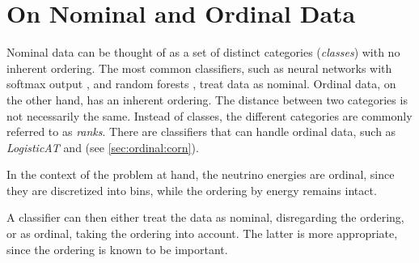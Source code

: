 \section{On Nominal and Ordinal Data}
Nominal data can be thought of as a set of distinct categories
  (\emph{classes})
with no inherent ordering.
The most common classifiers,
  such as
    neural networks with softmax output \cite{dsea_samuel},
    and random forests \cite{hymon2021seasonal},
treat data as nominal.
%
Ordinal data, on the other hand,
has an inherent ordering.
The distance between two categories is not necessarily the same. %
Instead of classes,
  the different categories are commonly referred to as \emph{ranks}.
There are classifiers that can handle ordinal data,
such as
  \emph{LogisticAT} \cite{logisticat, dsea_jan}
  and \corn{} (see \autoref{sec:ordinal:corn}).

In the context of the problem at hand,
  the neutrino energies are ordinal,
    since they are discretized into bins,
      while the ordering by energy remains intact.

A classifier can then either
  treat the data as nominal,
    disregarding the ordering,
  or as ordinal,
    taking the ordering into account.
The latter is more appropriate,
  since the ordering is known to be important. %






